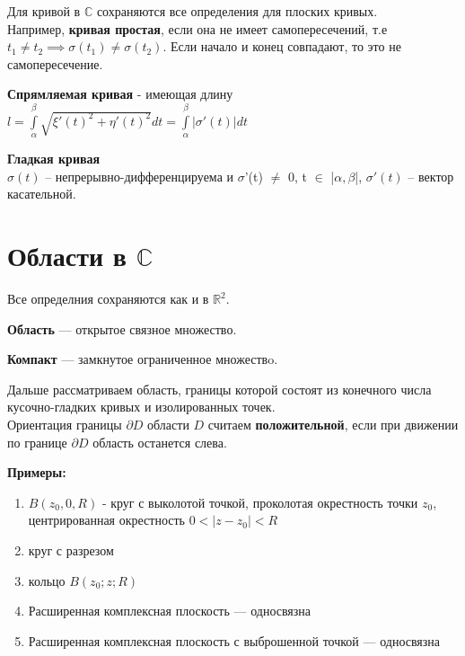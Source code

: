 \documentclass[a4paper, 12pt]{report}
\begin{document}
\par\bigskip
Для кривой в $\mathbb{C}$ сохраняются все определения для плоских кривых.
\\Например, \textbf{кривая простая}, если она не имеет самопересечений, т.е $t_1 \neq t_2 \implies \sigma(t_1) \neq \sigma(t_2)$. Если начало и конец совпадают, то это не самопересечение.
\par\bigskip
\textbf{Спрямляемая кривая} - имеющая длину $l = \int\limits_\alpha^\beta \sqrt{\xi'(t)^2 + \eta'(t)^2}dt = \int\limits_\alpha^\beta |\sigma'(t)|dt$
\par\bigskip
\textbf{Гладкая кривая}
\\$\sigma(t)$ -- непрерывно-дифференцируема и $\sigma$'(t) $\neq$ 0, t $\in$ |$\alpha, \beta$|, $\sigma'(t)$ -- вектор касательной.
\par\bigskip

\section{Области в $\mathbb{C}$}
Все определния сохраняются как и в $\mathbb{R}^2$.
\par \textbf{Область} --- открытое связное множество.
\par \textbf{Компакт} --- замкнутое ограниченное множествo.
\par\bigskip
Дальше рассматриваем область, границы которой состоят из конечного числа кусочно-гладких кривых и изолированных точек.
\\Ориентация границы $\partial D$ области $D$ считаем \textbf{положительной}, если при движении по границе $\partial D$ область останется слева.
\par\bigskip
\textbf{Примеры:}
\begin{enumerate}
    \item $B(z_0, 0, R)$ - круг с выколотой точкой, проколотая окрестность точки $z_0$, центрированная окрестность $0 < |z-z_0|<R$ 
\item круг с разрезом 
\item кольцо $B(z_0;z;R)$
\item Расширенная комплексная плоскость --- односвязна
\item Расширенная комплексная плоскость с выброшенной точкой --- односвязна
\end{enumerate}


\par\bigskip
\end{document}
